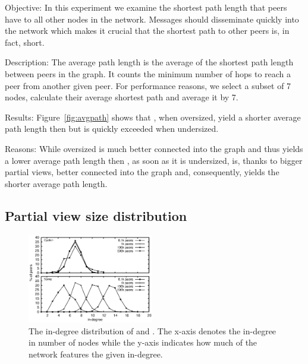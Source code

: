 \begin{asparadesc}
\item[Objective:] In this experiment we examine the shortest path length that
  peers have to all other nodes in the network.  Messages should disseminate
  quickly into the network which makes it crucial that the shortest path to
  other peers is, in fact, short.
\item[Description:] The average path length is the average of the shortest path
  length between peers in the graph. It counts the minimum number of hops to
  reach a peer from another given peer.  For performance reasons, we select a
  subset of 7 nodes, calculate their average shortest path and average it by 7.
\item[Results:] Figure~\ref{fig:avgpath} shows that \CYCLON{}, when oversized,
  yield a shorter average path length then \SCAMPLON{} but is quickly exceeded
  when undersized.
\item[Reasons:] While oversized \CYCLON{} is much better connected into the
  graph and thus yields a lower average path length then \SCAMPLON{}, as soon
  as it is undersized, \SCAMPLON{} is, thanks to bigger partial views, better
  connected into the graph and, consequently, yields the shorter average path
  length. 
\end{asparadesc}

\subsection{Partial view size distribution}
\label{subsec:dist}

\begin{figure}
  \centering
  \includegraphics[width=0.49\textwidth]{img/histo.eps}
  \caption{\label{fig:histo}The in-degree distribution of \CYCLON{} and \SCAMPLON{}.
  The x-axis denotes the in-degree in number of nodes while the y-axis indicates 
  how much of the network features the given in-degree.}
\end{figure}

